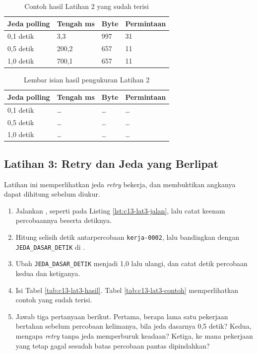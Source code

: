 \begin{table}[!htb]
  \centering
  \caption{Contoh hasil Latihan 2 yang sudah terisi}
  \label{tab:c13-lat2-contoh}
  \begin{tabularx}{\textwidth}{Xlll}
    \hline
    \textbf{Jeda polling} & \textbf{Tengah ms} & \textbf{Byte} & \textbf{Permintaan} \\
    \hline
    0,1 detik & 3,3 & 997 & 31 \\
    \hline
    0,5 detik & 200,2 & 657 & 11 \\
    \hline
    1,0 detik & 700,1 & 657 & 11 \\
    \hline
  \end{tabularx}
\end{table}

\begin{table}[!htb]
  \centering
  \caption{Lembar isian hasil pengukuran Latihan 2}
  \label{tab:c13-lat2-hasil}
  \begin{tabularx}{\textwidth}{Xlll}
    \hline
    \textbf{Jeda polling} & \textbf{Tengah ms} & \textbf{Byte} & \textbf{Permintaan} \\
    \hline
    0,1 detik & \dots & \dots & \dots \\
    \hline
    0,5 detik & \dots & \dots & \dots \\
    \hline
    1,0 detik & \dots & \dots & \dots \\
    \hline
  \end{tabularx}
\end{table}

\subsection*{Latihan 3: Retry dan Jeda yang Berlipat}

Latihan ini memperlihatkan jeda \textit{retry} bekerja, dan membuktikan
angkanya dapat dihitung sebelum diukur.

\begin{enumerate}
  \item Jalankan , seperti pada Listing
        \ref{lst:c13-lat3-jalan}, lalu catat keenam percobaannya beserta
        detiknya.
  \item Hitung selisih detik antarpercobaan \texttt{kerja-0002}, lalu
        bandingkan dengan \texttt{JEDA\_DASAR\_DETIK} di
        .
  \item Ubah \texttt{JEDA\_DASAR\_DETIK} menjadi 1,0 lalu ulangi, dan catat
        detik percobaan kedua dan ketiganya.
  \item Isi Tabel \ref{tab:c13-lat3-hasil}. Tabel \ref{tab:c13-lat3-contoh}
        memperlihatkan contoh yang sudah terisi.
  \item Jawab tiga pertanyaan berikut. Pertama, berapa lama satu pekerjaan
        bertahan sebelum percobaan kelimanya, bila jeda dasarnya 0,5 detik?
        Kedua, mengapa \textit{retry} tanpa jeda memperburuk keadaan? Ketiga,
        ke mana pekerjaan yang tetap gagal sesudah batas percobaan pantas
        dipindahkan?
\end{enumerate}

